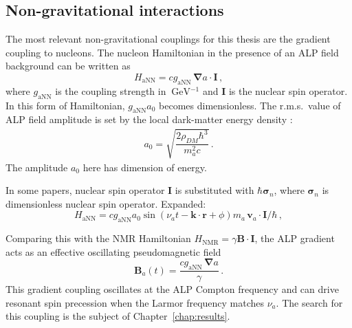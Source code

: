 \subsection{Non-gravitational interactions}
The most relevant non-gravitational couplings for this thesis are the gradient coupling to nucleons. The nucleon Hamiltonian in the presence of an ALP field background can be written as \cite{GrahamNewobservables}
\begin{equation}
    H_{\mathrm{aNN}} = c g_{\mathrm{aNN}}\,{\boldsymbol\nabla}a\cdot\mathbf{I}
    \,,\label{eq:HaNN}
\end{equation}
where $g_{\mathrm{aNN}}$ is the coupling strength in $\SI{}{\GeV^{-1}}$ and $\mathbf{I}$ is the nuclear spin operator. 
In this form of Hamiltonian, $g_{\mathrm{aNN}} a_0$ becomes dimensionless. 
The r.m.s.\ value of ALP field amplitude is set by the local dark-matter energy density \cite{BERGSTROM1998137,Jungman1992SupersymmetricDM,doi:10.1146/annurev.astro.39.1.137}:
\begin{align}
    a_0 = \sqrt{\dfrac{2 \rho_{DM} \hbar^3}{m_a^2 {c}}}
     \,.\label{eq:a0_rhoDM}
\end{align}
The amplitude $a_0$ here has dimension of energy. 


In some papers, nuclear spin operator $\mathbf{I}$ is substituted with $\hbar {\boldsymbol\sigma_n}$, where $ {\boldsymbol\sigma_n}$ is dimensionless nuclear spin operator. 
Expanded: 
\begin{equation}
    H_{\mathrm{aNN}} = c g_{\mathrm{aNN}} a_0 \sin(\nu_a t - \mathbf{k}\cdot\mathbf{r} + \phi) m_a \,\mathbf{v}_a\cdot\mathbf{I}/ \hbar
    \,,\label{eq:HaNN_vel}
\end{equation}

Comparing this with the NMR Hamiltonian $H_\mathrm{NMR} = \gamma\mathbf{B}\cdot\mathbf{I}$, the ALP gradient acts as an effective oscillating pseudomagnetic field
\begin{equation}
    \mathbf{B}_a(t) = \frac{c g_{\mathrm{aNN}}\,{\boldsymbol\nabla}a}{\gamma}
    \,.\label{eq:Bpseudo}
\end{equation}
This gradient coupling oscillates at the ALP Compton frequency and can drive resonant spin precession when the Larmor frequency matches $\nu_a$. The search for this coupling is the subject of Chapter~\ref{chap:results}.

